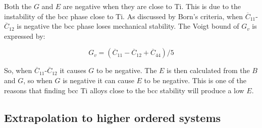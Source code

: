 Both the $G$ and $E$ are negative when they are close to Ti. This is due to the instability of the bcc phase close to Ti. As discussed by Born’s criteria, when $\overline{C}_{11}$-$\overline{C}_{12}$ is negative the bcc phase loses mechanical stability. The Voigt bound of $G_{v}$ is expressed by:

\begin{equation}
\label{eq: Gv}
G_v = \left( \overline{C}_{11}-\overline{C}_{12}+\overline{C}_{44} \right)/5
\end{equation}

So, when $\overline{C}_{11}$-$\overline{C}_{12}$ it causes $G$ to be negative. The $E$ is then calculated from the $B$ and $G$, so when $G$ is negative it can cause $E$ to be negative. This is one of the reasons that finding bcc Ti alloys close to the bcc stability will produce a low $E$. 



\subsection{Extrapolation to higher ordered systems}

